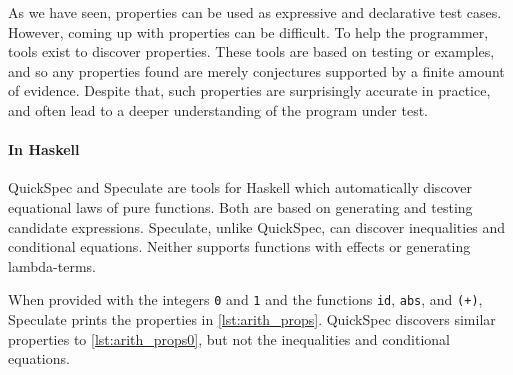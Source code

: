 As we have seen, properties can be used as expressive and declarative
test cases.  However, coming up with properties can be difficult.  To
help the programmer, tools exist to discover properties.  These tools
are based on testing or examples, and so any properties found are
merely conjectures supported by a finite amount of evidence.  Despite
that, such properties are surprisingly accurate in practice, and often
lead to a deeper understanding of the program under test.

\paragraph{In Haskell}
QuickSpec\cite{claessen2010,smallbone2017} and
Speculate\cite{braquehais2017} are tools for Haskell which
automatically discover equational laws of pure functions.  Both are
based on generating and testing candidate expressions.  Speculate,
unlike QuickSpec, can discover inequalities and conditional equations.
Neither supports functions with effects or generating lambda-terms.

When provided with the integers \verb|0| and \verb|1| and the
functions \verb|id|, \verb|abs|, and \verb|(+)|, Speculate prints the
properties in \cref{lst:arith_props}.  QuickSpec discovers similar
properties to \cref{lst:arith_props0}, but not the inequalities and
conditional equations.

